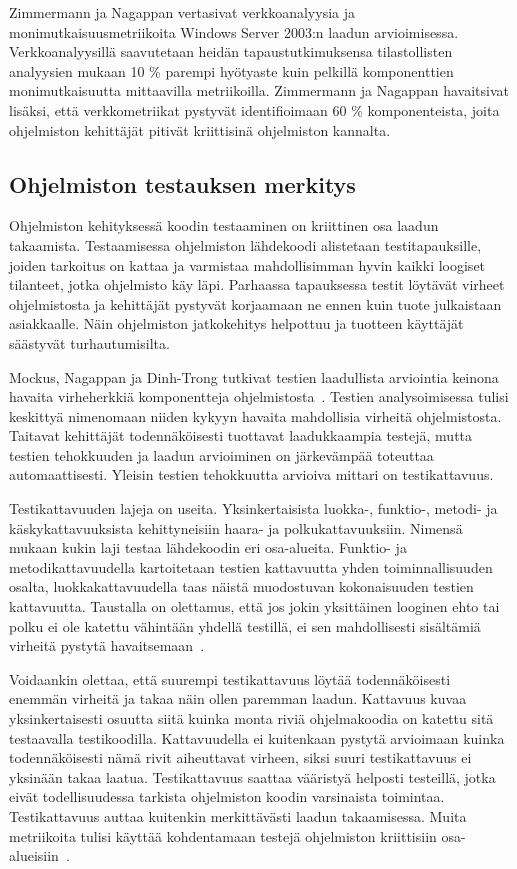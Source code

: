 \documentclass[finnish]{../tktltiki2}
\theoremstyle{definition}
\theoremstyle{remark}
\begin{document}
    Zimmermann ja Nagappan vertasivat verkkoanalyysia ja monimutkaisuusmetriikoita Windows Server 2003:n laadun 
arvioimisessa. Verkkoanalyysillä saavutetaan heidän tapaustutkimuksensa tilastollisten analyysien mukaan 10 \% parempi 
hyötyaste kuin pelkillä komponenttien monimutkaisuutta mittaavilla metriikoilla. Zimmermann ja Nagappan havaitsivat 
lisäksi, että verkkometriikat pystyvät identifioimaan 60 \% komponenteista, joita ohjelmiston kehittäjät pitivät 
kriittisinä ohjelmiston kannalta.

\subsection{Ohjelmiston testauksen merkitys}

Ohjelmiston kehityksessä koodin testaaminen on kriittinen osa laadun takaamista. Testaamisessa ohjelmiston lähdekoodi 
alistetaan testitapauksille, joiden tarkoitus on kattaa ja varmistaa mahdollisimman hyvin kaikki loogiset tilanteet, 
jotka ohjelmisto käy läpi. Parhaassa tapauksessa testit löytävät virheet ohjelmistosta ja kehittäjät pystyvät korjaamaan 
ne ennen kuin tuote julkaistaan asiakkaalle. Näin ohjelmiston jatkokehitys helpottuu ja tuotteen käyttäjät säästyvät 
turhautumisilta.

    Mockus, Nagappan ja Dinh-Trong tutkivat testien laadullista arviointia keinona havaita virheherkkiä komponentteja 
ohjelmistosta~\cite{MNDT09}. Testien analysoimisessa tulisi keskittyä nimenomaan niiden kykyyn havaita mahdollisia 
virheitä ohjelmistosta. Taitavat kehittäjät todennäköisesti tuottavat laadukkaampia testejä, mutta testien tehokkuuden 
ja laadun arvioiminen on järkevämpää toteuttaa automaattisesti. Yleisin testien tehokkuutta arvioiva mittari on 
testikattavuus.

    Testikattavuuden lajeja on useita. Yksinkertaisista luokka-, funktio-, metodi- ja käskykattavuuksista kehittyneisiin 
haara- ja polkukattavuuksiin. Nimensä mukaan kukin laji testaa lähdekoodin eri osa-alueita. Funktio- ja 
metodikattavuu\-della kartoitetaan testien kattavuutta yhden toiminnallisuuden osalta, luokkakattavuudella taas näistä 
muodostuvan kokonaisuuden testien kattavuutta. Taustalla on olettamus, että jos jokin yksittäinen looginen ehto tai 
polku ei ole katettu vähintään yhdellä testillä, ei sen mahdollisesti sisältämiä virheitä pystytä 
havaitsemaan~\cite{MNDT09}.

    Voidaankin olettaa, että suurempi testikattavuus löytää todennäköisesti enemmän virheitä ja takaa näin ollen 
paremman laadun. Kattavuus kuvaa yksinkertaisesti osuutta siitä kuinka monta riviä ohjelmakoodia on katettu sitä 
testaavalla testikoodilla. Kattavuudella ei kuitenkaan pystytä arvioimaan kuinka todennäköisesti nämä rivit aiheuttavat 
virheen, siksi suuri testikattavuus ei yksinään takaa laatua. Testikattavuus saattaa vääristyä helposti testeillä, jotka 
eivät todellisuudessa tarkista ohjelmiston koodin varsinaista toimintaa. Testikattavuus auttaa kuitenkin merkittävästi 
laadun takaamisessa. Muita metriikoita tulisi käyttää kohdentamaan testejä ohjelmiston kriittisiin 
osa-alueisiin~\cite{NB07, MNDT09}.
\end{document}
